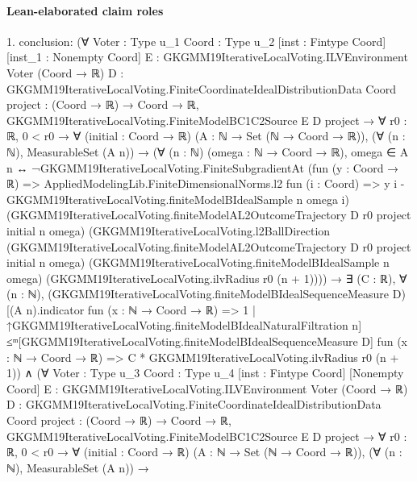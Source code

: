 \documentclass[10pt]{article}
\begin{document}
\paragraph{Lean-elaborated claim roles}\begin{ReviewVerbatim}
1. conclusion: (∀ {Voter : Type u_1} {Coord : Type u_2} [inst : Fintype Coord] [inst_1 : Nonempty Coord]
    {E : GKGMM19IterativeLocalVoting.ILVEnvironment Voter (Coord → ℝ)}
    {D : GKGMM19IterativeLocalVoting.FiniteCoordinateIdealDistributionData Coord} {project : (Coord → ℝ) → Coord → ℝ},
    GKGMM19IterativeLocalVoting.FiniteModelBC1C2Source E D project →
      ∀ {r0 : ℝ},
        0 < r0 →
          ∀ (initial : Coord → ℝ) (A : ℕ → Set (ℕ → Coord → ℝ)),
            (∀ (n : ℕ), MeasurableSet (A n)) →
              (∀ (n : ℕ) (omega : ℕ → Coord → ℝ),
                  omega ∈ A n ↔
                    ¬GKGMM19IterativeLocalVoting.FiniteSubgradientAt
                        (fun (y : Coord → ℝ) =>
                          AppliedModelingLib.FiniteDimensionalNorms.l2 fun (i : Coord) =>
                            y i - GKGMM19IterativeLocalVoting.finiteModelBIdealSample n omega i)
                        (GKGMM19IterativeLocalVoting.finiteModelAL2OutcomeTrajectory D r0 project initial n omega)
                        (GKGMM19IterativeLocalVoting.l2BallDirection
                          (GKGMM19IterativeLocalVoting.finiteModelAL2OutcomeTrajectory D r0 project initial n omega)
                          (GKGMM19IterativeLocalVoting.finiteModelBIdealSample n omega)
                          (GKGMM19IterativeLocalVoting.ilvRadius r0 (n + 1)))) →
                ∃ (C : ℝ),
                  ∀ (n : ℕ),
                    (GKGMM19IterativeLocalVoting.finiteModelBIdealSequenceMeasure
                          D)[(A n).indicator fun (x : ℕ → Coord → ℝ) => 1 |
                        ↑GKGMM19IterativeLocalVoting.finiteModelBIdealNaturalFiltration
                          n] ≤ᵐ[GKGMM19IterativeLocalVoting.finiteModelBIdealSequenceMeasure D]
                      fun (x : ℕ → Coord → ℝ) => C * GKGMM19IterativeLocalVoting.ilvRadius r0 (n + 1)) ∧
  (∀ {Voter : Type u_3} {Coord : Type u_4} [inst : Fintype Coord] [Nonempty Coord]
      {E : GKGMM19IterativeLocalVoting.ILVEnvironment Voter (Coord → ℝ)}
      {D : GKGMM19IterativeLocalVoting.FiniteCoordinateIdealDistributionData Coord} {project : (Coord → ℝ) → Coord → ℝ},
      GKGMM19IterativeLocalVoting.FiniteModelBC1C2Source E D project →
        ∀ {r0 : ℝ},
          0 < r0 →
            ∀ (initial : Coord → ℝ) (A : ℕ → Set (ℕ → Coord → ℝ)),
              (∀ (n : ℕ), MeasurableSet (A n)) →

\end{ReviewVerbatim}
\end{document}
